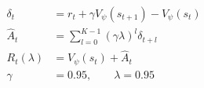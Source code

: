 \documentclass[border=8pt,12pt]{standalone}
\begin{document}
\color{ink}
$\displaystyle \begin{aligned}\delta_t&=r_t+\gamma V_\psi(s_{t+1})-V_\psi(s_t)\\ \hat A_t&=\sum_{l=0}^{K-1}(\gamma\lambda)^l\delta_{t+l}\\ R_t(\lambda)&=V_\psi(s_t)+\hat A_t\\ \gamma&=0.95,\qquad\lambda=0.95\end{aligned}$
\end{document}
